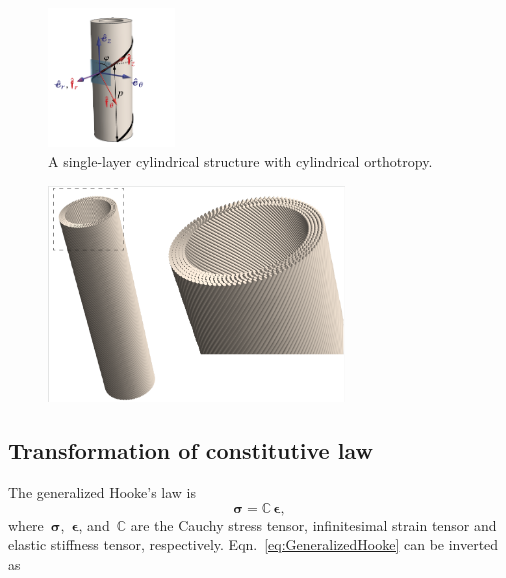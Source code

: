 \documentclass[preprint,12pt,times]{elsarticle}
\numberwithin{equation}{section}
\renewcommand{\u}[1]{\boldsymbol{#1}}
\renewcommand{\>}{$\Rightarrow$}
\begin{document}
\begin{figure}[t]
	\centering
	\graphicspath{{../LyxFiles/figure/}}
	\includegraphics[width=0.3\textwidth]{schematic_V7.pdf}
	\caption{A single-layer cylindrical structure with cylindrical orthotropy.
  }
	\label{fig:schematic}
\end{figure}


\begin{figure}[t]
    \centering
    \graphicspath{{../LyxFiles/figure/}}
    \includegraphics[width=0.7\textwidth]{HelixMicroStructure.png}
    \label{fig:HelixMicroStructure}
\end{figure}



\subsection{Transformation of constitutive law}
\label{sec:MatrixTrans}
The generalized Hooke's law is
\begin{equation}
\u{\sigma} = \mathbb{C}\, \u{\epsilon},
\label{eq:GeneralizedHooke}
\end{equation}
where~$\u{\sigma}$,~$\u{\epsilon}$, and~$\mathbb{C}$ are the Cauchy stress tensor, infinitesimal strain tensor and elastic stiffness tensor, respectively. Eqn.~\eqref{eq:GeneralizedHooke} can be inverted as
\end{document}
